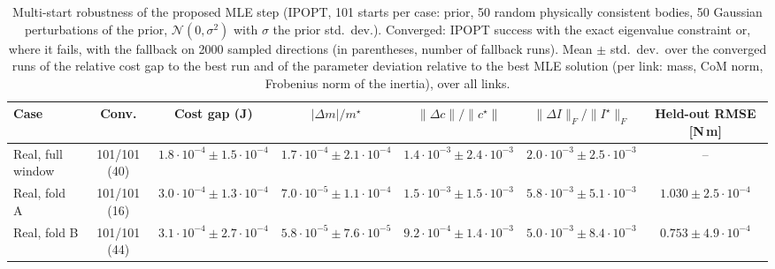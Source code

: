 \begin{table}[t]
\caption{Multi-start robustness of the proposed MLE step (IPOPT, 101 starts per case: prior, 50 random physically
consistent bodies, 50 Gaussian perturbations of the prior, $\mathcal{N}(0,\sigma^2)$ with $\sigma$ the prior std.\ dev.). Converged: IPOPT success with the exact eigenvalue constraint
or, where it fails, with the fallback on 2000 sampled directions (in parentheses, number of fallback runs). Mean $\pm$ std.\ dev.\ over the converged runs of the relative
cost gap to the best run and of the parameter deviation relative to the best MLE solution (per link: mass,
CoM norm, Frobenius norm of the inertia), over all links.}
\label{tab:multistart}
\centering\footnotesize\setlength{\tabcolsep}{3pt}
\begin{tabular}{lcccccc}
\toprule
Case & Conv. & Cost gap (J)& $|\Delta m|/m^\star$ & $\|\Delta c\|/\|c^\star\|$ & $\|\Delta I\|_F/\|I^\star\|_F$ & Held-out RMSE [N\,m]\\
\midrule
Real, full window & 101/101 (40) & $1.8\cdot10^{-4} \pm 1.5\cdot10^{-4}$ & $1.7\cdot10^{-4} \pm 2.1\cdot10^{-4}$ & $1.4\cdot10^{-3} \pm 2.4\cdot10^{-3}$ & $2.0\cdot10^{-3} \pm 2.5\cdot10^{-3}$ & -- \\
Real, fold A & 101/101 (16) & $3.0\cdot10^{-4} \pm 1.3\cdot10^{-4}$ & $7.0\cdot10^{-5} \pm 1.1\cdot10^{-4}$ & $1.5\cdot10^{-3} \pm 1.5\cdot10^{-3}$ & $5.8\cdot10^{-3} \pm 5.1\cdot10^{-3}$ & $1.030 \pm 2.5\cdot10^{-4}$ \\
Real, fold B & 101/101 (44) & $3.1\cdot10^{-4} \pm 2.7\cdot10^{-4}$ & $5.8\cdot10^{-5} \pm 7.6\cdot10^{-5}$ & $9.2\cdot10^{-4} \pm 1.4\cdot10^{-3}$ & $5.0\cdot10^{-3} \pm 8.4\cdot10^{-3}$ & $0.753 \pm 4.9\cdot10^{-4}$ \\
\bottomrule
\end{tabular}
\end{table}
